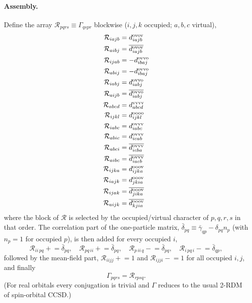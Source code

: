 \documentclass[11pt]{article}
\begin{document}
\paragraph{Assembly.} Define the array $\mathcal R_{pqrs}\equiv\Gamma_{qspr}$ blockwise ($i,j,k$ occupied; $a,b,c$ virtual),
\begin{align*}
  \mathcal R_{iajb} &= d^{\rm ovov}_{iajb} \\
  \mathcal R_{aibj} &= \overline{d^{\rm ovov}_{iajb}} \\
  \mathcal R_{ijab} &= -d^{\rm ovvo}_{ibaj} \\
  \mathcal R_{abij} &= -d^{\rm ovvo}_{ibaj} \\
  \mathcal R_{iabj} &= d^{\rm ovvo}_{iabj} \\
  \mathcal R_{aijb} &= \overline{d^{\rm ovvo}_{iabj}} \\
  \mathcal R_{abcd} &= d^{\rm vvvv}_{abcd} \\
  \mathcal R_{ijkl} &= d^{\rm oooo}_{ijkl} \\
  \mathcal R_{iabc} &= d^{\rm ovvv}_{iabc} \\
  \mathcal R_{abic} &= d^{\rm ovvv}_{icab} \\
  \mathcal R_{abci} &= \overline{d^{\rm ovvv}_{icba}} \\
  \mathcal R_{aibc} &= \overline{d^{\rm ovvv}_{iacb}} \\
  \mathcal R_{ijka} &= d^{\rm ooov}_{ijka} \\
  \mathcal R_{iajk} &= d^{\rm ooov}_{jkia} \\
  \mathcal R_{ijak} &= \overline{d^{\rm ooov}_{jika}} \\
  \mathcal R_{aijk} &= \overline{d^{\rm ooov}_{kjia}}
\end{align*}
where the block of $\mathcal R$ is selected by the occupied/virtual character of $p,q,r,s$ in that order.
The correlation part of the one-particle matrix, $\bar\delta_{pq}\equiv\bar\gamma_{qp}-\delta_{pq}n_p$ (with $n_p=1$ for
occupied $p$), is then added for every occupied $i$,
\begin{equation}
\mathcal R_{ii\,pq}\mathrel{+}=\bar\delta_{pq},\quad \mathcal R_{pq\,ii}\mathrel{+}=\bar\delta_{pq},\quad
\mathcal R_{p\,ii\,q}\mathrel{-}=\bar\delta_{pq},\quad \mathcal R_{i\,pq\,i}\mathrel{-}=\bar\delta_{qp},
\end{equation}
followed by the mean-field part, $\mathcal R_{iijj}\mathrel{+}=1$ and $\mathcal R_{ijji}\mathrel{-}=1$ for all occupied
$i,j$, and finally
\begin{equation}
\Gamma_{pqrs}=\mathcal R_{rpsq}.
\end{equation}
(For real orbitals every conjugation is trivial and $\Gamma$ reduces to the usual 2-RDM of spin-orbital CCSD.)
\end{document}
